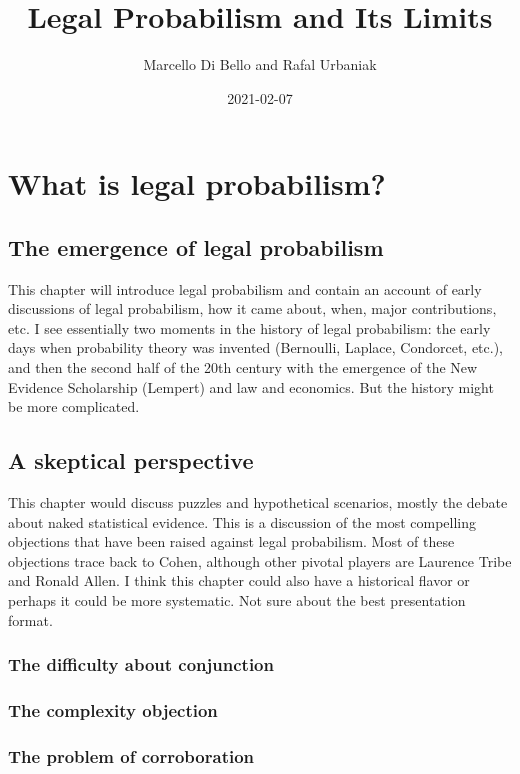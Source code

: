\documentclass[]{book}
\title{Legal Probabilism and Its Limits}
\author{Marcello Di Bello and Rafal Urbaniak}
\date{2021-02-07}
\begin{document}
\maketitle

{
\setcounter{tocdepth}{1}
\tableofcontents
}
\part{What is legal probabilism?}

\chapter{The emergence of legal probabilism}

This chapter will introduce legal probabilism and contain an account of early\\
discussions of legal probabilism, how
it came about, when, major contributions, etc.
I see essentially two moments in
the history of legal probabilism: the early days when probability
theory was invented (Bernoulli, Laplace, Condorcet, etc.), and then
the second half of the 20th century with the emergence
of the New Evidence Scholarship (Lempert)
and law and economics. But the history
might be more complicated.

\chapter{A skeptical perspective}

This chapter would discuss puzzles and
hypothetical scenarios, mostly the debate
about naked statistical evidence. This
is a discussion of the most compelling objections that have
been raised against legal probabilism.
Most of these objections
trace back to Cohen, although
other pivotal players
are Laurence Tribe and Ronald Allen.
I think this chapter could
also have a historical flavor or perhaps it could be more
systematic. Not sure about
the best presentation format.

\section{The difficulty about conjunction}

\section{The complexity objection}

\section{The problem of corroboration}
\end{document}
